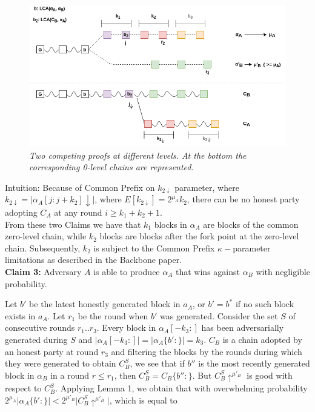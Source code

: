\begin{figure}[h]
	\begin{center}
		\includegraphics[scale=0.5]{figures/proof.png}
	\end{center}
	\caption{\textit{Two competing proofs at different levels. At the bottom the corresponding 0-level chains are represented.}}
	\label{fig:proof}
\end{figure}

Intuition: Because of Common Prefix on $k_{2\downarrow}$ parameter, where $k_{2\downarrow} = \vert \alpha_A[j:j+k_2]\downarrow\vert$, where $E[k_{2\downarrow}] = 2^{\mu_A}k_2$, there can be no honest party adopting $C_A$ at any round $i \geq k_1 + k_2 + 1$. \\

From these two Claims we have that $k_1$ blocks in $\alpha_A$ are blocks of the common zero-level chain, while $k_2$ blocks are blocks after the fork point at the zero-level chain. Subsequently, $k_2$ is subject to the Common Prefix $\kappa-$parameter limitations as described in the Backbone paper\cite{Backbone}.\\

\textbf{Claim 3:} Adversary $A$ is able to produce $\alpha_A$ that wins against $\alpha_B$ with negligible probability.

Let $b'$ be the latest honestly generated block in $a_A$, or $b' = b^*$ if no such block exists in $a_A$. Let $r_1$ be the round when $b'$ was generated. Consider the set $S$ of consecutive rounds $r_1..r_3$. Every block in $\alpha_A[-k_3:]$ has been adversarially generated during $S$ and $\vert \alpha_A[-k_3:] \vert = \vert \alpha_A\{b':\} \vert = k_3$. $C_B$ is a chain adopted by an honest party at round $r_3$ and filtering the blocks by the rounds during which they were generated to obtain $C_B^S$, we see that if $b''$ is the most recently generated block in $\alpha_B$ in a round $r \leq r_1$, then $C_B^S = C_B\{ b'': \}$. But $C_B^S \uparrow^{\mu'_B}$ is good with respect to $C_B^S$. Applying Lemma 1, we obtain that with overwhelming probability  $2^{\mu_A} \vert \alpha_A\{b':\} \vert < 2^{\mu'_B} \vert C_B^S \uparrow^{\mu'_B} \vert$, which is equal to

